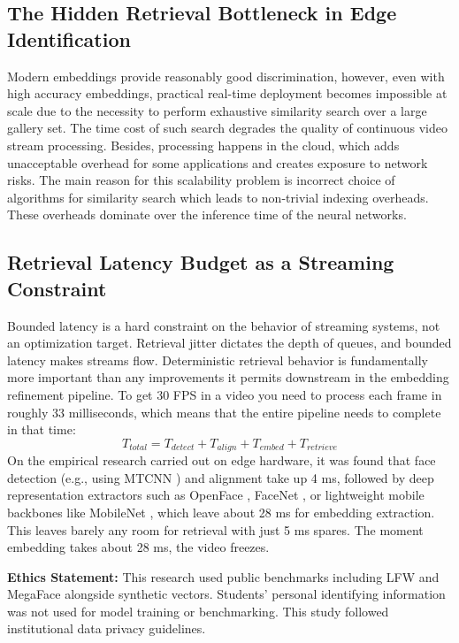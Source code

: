 \documentclass[conference]{IEEEtran}
\begin{document}
\subsection{The Hidden Retrieval Bottleneck in Edge Identification}
Modern embeddings provide reasonably good discrimination, however, even with high accuracy embeddings, practical real-time deployment becomes impossible at scale due to the necessity to perform exhaustive similarity search over a large gallery set. The time cost of such search degrades the quality of continuous video stream processing. Besides, processing happens in the cloud, which adds unacceptable overhead for some applications and creates exposure to network risks. The main reason for this scalability problem is incorrect choice of algorithms for similarity search which leads to non-trivial indexing overheads. These overheads dominate over the inference time of the neural networks.

\subsection{Retrieval Latency Budget as a Streaming Constraint}
Bounded latency is a hard constraint on the behavior of streaming systems, not an optimization target. Retrieval jitter dictates the depth of queues, and bounded latency makes streams flow. Deterministic retrieval behavior is fundamentally more important than any improvements it permits downstream in the embedding refinement pipeline. To get 30 FPS in a video you need to process each frame in roughly 33 milliseconds, which means that the entire pipeline needs to complete in that time:
\begin{equation}
T_{total} = T_{detect} + T_{align} + T_{embed} + T_{retrieve}
\end{equation}
On the empirical research carried out on edge hardware, it was found that face detection (e.g., using MTCNN \cite{b13}) and alignment take up 4 ms, followed by deep representation extractors such as OpenFace \cite{b17}, FaceNet \cite{b18}, or lightweight mobile backbones like MobileNet \cite{b4}, which leave about 28 ms for embedding extraction. This leaves barely any room for retrieval with just 5 ms spares. The moment embedding takes about 28 ms, the video freezes.

\textbf{Ethics Statement:} This research used public benchmarks including LFW \cite{lfw} and MegaFace \cite{megaface} alongside synthetic vectors. Students’ personal identifying information was not used for model training or benchmarking. This study followed institutional data privacy guidelines.
\end{document}
